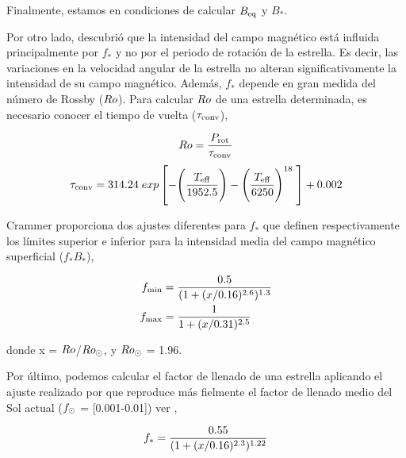 Finalmente, estamos en condiciones de calcular $B_{\mathrm{eq}}$ y $B_*$.\par

Por otro lado, \cite{Cranmer2011} descubrió que la intensidad del campo magnético está influida principalmente por $f_*$ y no por el periodo de rotación de la estrella. Es decir, las variaciones en la velocidad angular de la estrella no alteran significativamente la intensidad de su campo magnético. Además, $f_*$ depende en gran medida del número de Rossby ($Ro$). Para calcular $Ro$ de una estrella determinada, es necesario conocer el tiempo de vuelta ($\tau_{\mathrm{conv}}$),

\begin{ceqn}
	\begin{equation}
		Ro = \frac{P_{\mathrm{rot}}}{\tau_{\mathrm{conv}}} \label{eq:mf_rossby}
	\end{equation}
	\begin{equation}
		\tau_{\mathrm{conv}} = 314.24\;exp\left[-\Bigg(\frac{T_{\mathrm{eff}}}{1952.5}\Bigg)-\Bigg(\frac{T_{\mathrm{eff}}}{6250}\Bigg)^{18} \;\right]+0.002 \label{eq:mf_turnover}
	\end{equation}
\end{ceqn}

\cite{Cranmer2011} Crammer proporciona dos ajustes diferentes para $f_*$ que definen respectivamente los límites superior e inferior para la intensidad media del campo magnético superficial ($f_*B_*$),

\begin{ceqn}
	\begin{align}
		f_{\mathrm{min}} &= \frac{0.5}{(1+(x/0.16)^{2.6})^{1.3}} \label{eq:fmin}\\
		f_{\mathrm{max}} &= \frac{1}{1+(x/0.31)^{2.5}} \label{eq:fmax}
	\end{align}
\end{ceqn}

donde x = $Ro$/$Ro_\odot$, y $Ro_\odot$ = 1.96. \par

Por último, podemos calcular el factor de llenado de una estrella aplicando el ajuste realizado por \cite{Gallet2013} que reproduce más fielmente el factor de llenado medio del Sol actual ($f_{\mathrm{\odot}}$ = [0.001-0.01]) ver \cite{Cranmer2011},

\begin{ceqn}
	\begin{equation}
		f_{\mathrm{*}} = \frac{0.55}{(1+(x/0.16)^{2.3})^{1.22}} \label{eq:fstart}
	\end{equation}
\end{ceqn}

